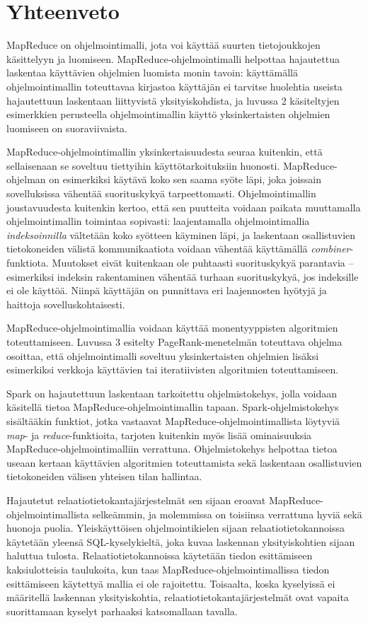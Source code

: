 \documentclass[finnish]{templates/tktltiki2}
\theoremstyle{definition}
\theoremstyle{remark}
\begin{document}
\section{Yhteenveto}\label{yhteenveto}

MapReduce on ohjelmointimalli, jota voi käyttää suurten tietojoukkojen
käsittelyyn ja luomiseen. MapReduce-ohjelmointimalli helpottaa
hajautettua laskentaa käyttävien ohjelmien luomista monin tavoin:
käyttämällä ohjelmointimallin toteuttavaa kirjastoa käyttäjän ei
tarvitse huolehtia useista hajautettuun laskentaan liittyvistä
yksityiskohdista, ja luvussa 2 käsiteltyjen esimerkkien perusteella
ohjelmointimallin käyttö yksinkertaisten ohjelmien luomiseen on
suoraviivaista.

MapReduce-ohjelmointimallin yksinkertaisuudesta seuraa kuitenkin, että
sellaisenaan se soveltuu tiettyihin käyttötarkoituksiin huonosti.
MapReduce-ohjelman on esimerkiksi käytävä koko sen saama syöte läpi,
joka joissain sovelluksissa vähentää suorituskykyä tarpeettomasti.
Ohjelmointimallin joustavuudesta kuitenkin kertoo, että sen puutteita
voidaan paikata muuttamalla ohjelmointimallin toimintaa sopivasti:
laajentamalla ohjelmointimallia \emph{indeksoinnilla} vältetään koko
syötteen käyminen läpi, ja laskentaan osallistuvien tietokoneiden
välistä kommunikaatiota voidaan vähentää käyttämällä
\emph{combiner}-funktiota. Muutokset eivät kuitenkaan ole puhtaasti
suorituskykyä parantavia -- esimerkiksi indeksin rakentaminen vähentää
turhaan suorituskykyä, jos indeksille ei ole käyttöä. Niinpä käyttäjän
on punnittava eri laajennosten hyötyjä ja haittoja sovelluskohtaisesti.

MapReduce-ohjelmointimallia voidaan käyttää monentyyppisten algoritmien
toteuttamiseen. Luvussa 3 esitelty PageRank-menetelmän toteuttava
ohjelma osoittaa, että ohjelmointimalli soveltuu yksinkertaisten
ohjelmien lisäksi esimerkiksi verkkoja käyttävien tai iteratiivisten
algoritmien toteuttamiseen.

Spark on hajautettuun laskentaan tarkoitettu ohjelmistokehys, jolla
voidaan käsitellä tietoa MapReduce-ohjelmointimallin tapaan.
Spark-ohjelmistokehys sisältääkin funktiot, jotka vastaavat
MapReduce-ohjelmointimallista löytyviä \emph{map}- ja
\emph{reduce}-funktioita, tarjoten kuitenkin myös lisää ominaisuuksia
MapReduce-ohjelmointimalliin verrattuna. Ohjelmistokehys helpottaa
tietoa useaan kertaan käyttävien algoritmien toteuttamista sekä
laskentaan osallistuvien tietokoneiden välisen yhteisen tilan hallintaa.

Hajautetut relaatiotietokantajärjestelmät sen sijaan eroavat
MapReduce-ohjelmointimallista selkeämmin, ja molemmissa on toisiinsa
verrattuna hyviä sekä huonoja puolia. Yleiskäyttöisen ohjelmointikielen
sijaan relaatiotietokannoissa käytetään yleensä SQL-kyselykieltä, joka
kuvaa laskennan yksityiskohtien sijaan haluttua tulosta.
Relaatiotietokannoissa käytetään tiedon esittämiseen kaksiulotteisia
taulukoita, kun taas MapReduce-ohjelmointimallissa tiedon esittämiseen
käytettyä mallia ei ole rajoitettu. Toisaalta, koska kyselyissä ei
määritellä laskennan yksityiskohtia, relaatiotietokantajärjestelmät ovat
vapaita suorittamaan kyselyt parhaaksi katsomallaan tavalla.
\end{document}
